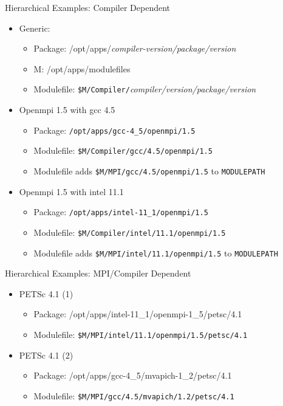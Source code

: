\documentclass{beamer}
\begin{document}
\begin{frame}{Hierarchical Examples: Compiler Dependent}
  \begin{itemize}
    \item Generic:
      \begin{itemize}
        \item Package: /opt/apps/\emph{compiler-version/package/version}
        \item M: {\color{blue}/opt/apps/modulefiles}
        \item Modulefile: \texttt{{\color{blue}\$M}/Compiler/}\emph{compiler/version/package/version}
      \end{itemize}
    \item Openmpi 1.5 with gcc 4.5
      \begin{itemize}
        \item Package: \texttt{/opt/apps/gcc-4\_5/openmpi/1.5}
        \item Modulefile: \texttt{{\color{blue}\$M}/Compiler/gcc/4.5/openmpi/1.5}
        \item Modulefile adds \texttt{{\color{blue}\$M}/MPI/gcc/4.5/openmpi/1.5}
          to \texttt{MODULEPATH} \\
      \end{itemize}          
    \item Openmpi 1.5 with intel 11.1
      \begin{itemize}
        \item Package: \texttt{/opt/apps/intel-11\_1/openmpi/1.5}
        \item Modulefile: \texttt{{\color{blue}\$M}/Compiler/intel/11.1/openmpi/1.5}
        \item Modulefile adds \texttt{\$M/MPI/intel/11.1/openmpi/1.5}
          to \texttt{MODULEPATH}
          
      \end{itemize}
  \end{itemize}
\end{frame}

\begin{frame}{Hierarchical Examples: MPI/Compiler Dependent}
  \begin{itemize}
    \item PETSc 4.1 (1)
      \begin{itemize}
        \item Package: /opt/apps/intel-11\_1/openmpi-1\_5/petsc/4.1
        \item Modulefile: \texttt{{\color{blue}\$M}/MPI/intel/11.1/openmpi/1.5/petsc/4.1}
      \end{itemize}
    \item PETSc 4.1 (2)
      \begin{itemize}
        \item Package: /opt/apps/gcc-4\_5/mvapich-1\_2/petsc/4.1
        \item Modulefile: \texttt{{\color{blue}\$M}/MPI/gcc/4.5/mvapich/1.2/petsc/4.1}
      \end{itemize}
  \end{itemize}
\end{frame}
\end{document}
